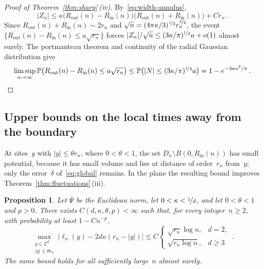 \documentclass[11pt]{amsart}
\theoremstyle{plain}
\newtheorem{proposition}[theorem]{Proposition}
\theoremstyle{definition}
\newcommand{\Z}{\mathbb Z}
\renewcommand{\P}{\mathbb P}
\newcommand{\drift}{\kappa}
\newcommand{\gauge}{\Psi}
\newcommand{\nf}{\nicefrac}
\newcommand{\Rin}{R_{\mathrm{in}}}
\newcommand{\Rout}{R_{\mathrm{out}}}
\numberwithin{equation}{section}
\begin{document}
\begin{proof}[Proof of Theorem~\ref{thm:sharp}\,\textup{(iv)}]
By~\eqref{eq:width-annulus},
\begin{equation*}
|Z_n|\leq\drift\bigl(\Rout(n)-\Rin(n)\bigr)\bigl(\Rout(n)+\Rin(n)\bigr)+Cr_n\, .
\end{equation*}
Since $\Rout(n)+\Rin(n)\sim2r_n$ and $\sqrt n=(4\pi\drift/3)^{\nf12}r_n^{\nf32}$, the event $\{\Rout(n)-\Rin(n)\leq a\sqrt{r_n}\}$ forces $|Z_n|/\sqrt n\leq(3\drift/\pi)^{\nf12}a+o(1)$ almost surely. The portmanteau theorem and continuity of the radial Gaussian distribution give
\begin{equation*}
\limsup_{n\to\infty}\P\bigl(\Rout(n)-\Rin(n)\leq a\sqrt{r_n}\bigr)
\leq\P\bigl(|N|\leq(3\drift/\pi)^{\nf12}a\bigr)
=1-e^{-3\drift a^2/\pi}\, .
\end{equation*}
\end{proof}

\subsection{Upper bounds on the local times away from the boundary}

At sites~$y$ with $|y|\leq\theta r_n$, where $0<\theta<1$, the set $D_n\setminus B(0,\Rin(n))$ has small potential, because it has small volume and lies at distance of order~$r_n$ from~$y$; only the error~$\delta$ of~\eqref{eq:global} remains. In the plane the resulting bound improves Theorem~\ref{thm:fluctuations}\,(iii).

\begin{proposition}\label{prop:bulk-profile}
Let $\gauge$ be the Euclidean norm, let $0<\drift<\nf1d$, and let $0<\theta<1$ and $p>0$. There exists $C(d,\drift,\theta,p)<\infty$ such that, for every integer~$n\geq2$, with probability at least $1-Cn^{-p}$,
\begin{equation}\label{eq:bulk-profile}
\max_{\substack{y\in\Z^d\\|y|\leq\theta r_n}}\bigl|\ell_n(y)-2d\drift(r_n-|y|)\bigr|
\leq C\begin{cases}\sqrt{r_n}\log n,&d=2,\\\sqrt{r_n\log n},&d\geq3\end{cases}\, .
\end{equation}
The same bound holds for all sufficiently large~$n$ almost surely.
\end{proposition}
\end{document}
